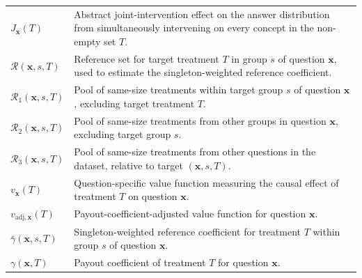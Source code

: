 \begin{longtable}{@{}>{\raggedright\arraybackslash}p{} p{}@{}}
	$J_{\mathbf{x}}(T)$                                & Abstract joint-intervention effect on the answer distribution from simultaneously intervening on every concept in the non-empty set $T$.                                                                           \\
	$\mathcal{R}(\mathbf{x},s,T)$                      & Reference set for target treatment $T$ in group $s$ of question $\mathbf{x}$, used to estimate the singleton-weighted reference coefficient.                                                                       \\
	$\mathcal{R}_1(\mathbf{x},s,T)$                    & Pool of same-size treatments within target group $s$ of question $\mathbf{x}$, excluding target treatment $T$.                                                                                                     \\
	$\mathcal{R}_2(\mathbf{x},s,T)$                    & Pool of same-size treatments from other groups in question $\mathbf{x}$, excluding target group $s$.                                                                                                               \\
	$\mathcal{R}_3(\mathbf{x},s,T)$                    & Pool of same-size treatments from other questions in the dataset, relative to target $(\mathbf{x},s,T)$.                                                                                                           \\
	$v_{\mathbf{x}}(T)$                                & Question-specific value function measuring the causal effect of treatment $T$ on question $\mathbf{x}$.                                                                                                            \\
	$v_{\mathrm{adj},\mathbf{x}}(T)$                   & Payout-coefficient-adjusted value function for question $\mathbf{x}$.                                                                                                                                              \\
	$\bar{\gamma}(\mathbf{x},s,T)$                     & Singleton-weighted reference coefficient for treatment $T$ within group $s$ of question $\mathbf{x}$.                                                                                                              \\
	$\gamma(\mathbf{x},T)$                             & Payout coefficient of treatment $T$ for question $\mathbf{x}$.                                                                                                                                                     \\

\end{longtable}
